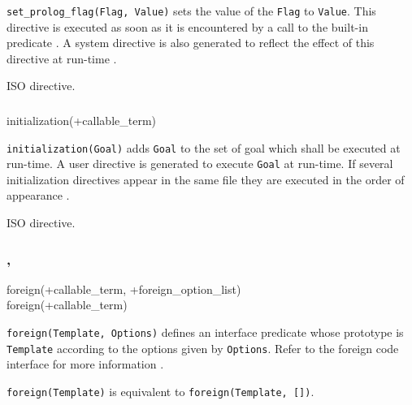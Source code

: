 \Description

\texttt{set\_prolog\_flag(Flag, Value)} sets the value of the
 \texttt{Flag} to \texttt{Value}. This directive is
executed as soon as it is encountered by a call to the built-in predicate
 . A system directive
is also generated to reflect the effect of this directive at run-time
.

\Portability

ISO directive.

\subsubsection{ \label{initialization/1}}

\begin{TemplatesOneCol}
initialization(+callable\_term)

\end{TemplatesOneCol}

\Description

\texttt{initialization(Goal)} adds \texttt{Goal} to the set of goal which
shall be executed at run-time. A user directive is generated to execute
\texttt{Goal} at run-time. If several initialization directives appear in
the same file they are executed in the order of appearance
.

\Portability

ISO directive.

\subsubsection{,
                \label{foreign/2}}

\begin{TemplatesOneCol}
foreign(+callable\_term, +foreign\_option\_list)\\
foreign(+callable\_term)

\end{TemplatesOneCol}

\Description

\texttt{foreign(Template, Options)} defines an interface predicate whose
prototype is \texttt{Template} according to the options given by
\texttt{Options}. Refer to the foreign code interface for more information
.

\texttt{foreign(Template)} is equivalent to \texttt{foreign(Template, [])}.

